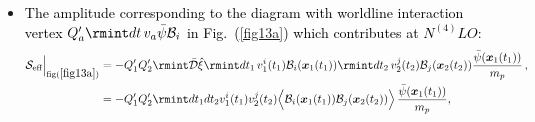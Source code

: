 \begin{itemize}
\begin{align}
    \begin{split}
  \mathcal{S}_{\text{eff}}^{ikm}\Big |_{{\text{fig}(\ref{fig13n})}} &=\frac{m_1m_2 s_1 s_2}{m_p^3}\rmint \Bar{\mathcal{D}}\hat\xi\rmint dt_1 \varphi(\boldsymbol{x}_1(t_1))\bar{\psi}(x_0) \rmint d^4 x\partial_0\varphi(x)\partial_0\varphi(x)\rmint dt_2 \varphi(\boldsymbol{x}_2(t_2))\,, \\&
=\frac{m_1 m_2 s_1 s_2}{16 \pi m_p^2}\rmint dt \,e^{-mr}\Bigg\{\Big(\frac{\boldsymbol{v}_1\cdot\boldsymbol{v}_2}{r}-\frac{(\boldsymbol{v}_1\cdot \hat{n})(\boldsymbol{v}_2\cdot \hat{n})}{r}\Big)+\frac{m}{2}\,(\boldsymbol{v}_2\cdot \Hat{n})(\boldsymbol{v}_1\cdot \hat{n})\Bigg\}\,\frac{\Bar{\psi}(\boldsymbol{x}_0(t)}{m_p}\\&+T(\Dot{\Bar{\psi}})+ (1 \leftrightarrow 2)
\sim \mathcal{O}({L^{1/2}v^{9/2}}),
\end{split}
\end{align}
where $T(\dot{\bar{\psi}})$ is given in  equation (\ref{5.26}) and we just need to replace $\phi$ by $\psi$. 
\begin{align}
    \begin{split}
        T(\Dot{\Bar{\psi}})&=-\frac{m_1 m_2 s_1 s_2}{16\pi m_p^2}\rmint dt\, e^{-mr}(\boldsymbol{v}_2\cdot \Hat{n})\frac{ \Dot{\Bar{\psi}}(\boldsymbol{x}_0(t))}{m_p},\\ &
        =\frac{m_1 m_2 s_1 s_2}{16\pi m_p^2}\rmint dt \frac{e^{-mr}}{r}(\boldsymbol{v}_2\cdot \Dot{\boldsymbol{r}}+\Vec{a}_2\cdot \boldsymbol{r})\,\frac{\Bar{\psi}(\boldsymbol{x}_0(t))}{m_p}\,.
    \end{split}
\end{align}
\item \textcolor{black}{The amplitude corresponding to the diagram with worldline interaction vertex $Q_a'\rmint dt\,v_a\Bar{\psi}\mathcal{B}_i$ in Fig.~(\ref{fig13a}) which contributes at $N^{(4)}LO :$ }
\begin{align}
    \begin{split}
         \mathcal{S}_{\text{eff}}\Big |_{\text{fig}(\ref{fig13a})}&=-Q_1' Q_2'\rmint\Bar{\mathcal{D}}\Hat{\xi}\rmint dt_1\,v_1^i(t_1)\mathcal{B}_i(\boldsymbol{x}_1(t_1))\rmint dt_2 \,v_2^j(t_2)\mathcal{B}_j(\boldsymbol{x}_2(t_2))\frac{\Bar{\psi}(\boldsymbol{x}_1(t_1))}{m_p}\,,\\ &
         =-Q_1'Q_2'\rmint dt_1 dt_2 v_1^i(t_1)v_2^{j}(t_2)\Big\langle\mathcal{B}_i(\boldsymbol{x}_1(t_1))\mathcal{B}_j(\boldsymbol{x}_2(t_2))\Big\rangle\,\frac{\bar\psi(\boldsymbol{x}_1(t_1))}{m_p},\\ &

\end{split}
\end{align}
\end{itemize}
